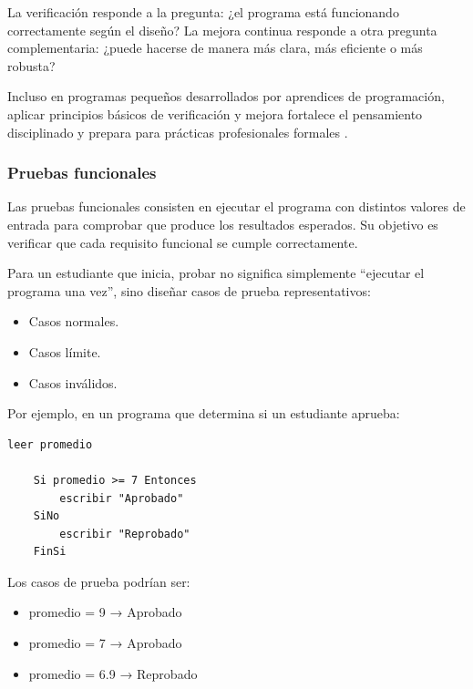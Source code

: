 \documentclass[12pt,twoside]{book}
\begin{document}
					La verificación responde a la pregunta: ¿el programa está funcionando correctamente según el diseño? La mejora continua responde a otra pregunta complementaria: ¿puede hacerse de manera más clara, más eficiente o más robusta?
					
					Incluso en programas pequeños desarrollados por aprendices de programación, aplicar principios básicos de verificación y mejora fortalece el pensamiento disciplinado y prepara para prácticas profesionales formales \cite{SWEBOK2025Guide}.
						
					\subsubsection{Pruebas funcionales}
						\noindent
						Las pruebas funcionales consisten en ejecutar el programa con distintos valores de entrada para comprobar que produce los resultados esperados. Su objetivo es verificar que cada requisito funcional se cumple correctamente.
						
						Para un estudiante que inicia, probar no significa simplemente “ejecutar el programa una vez”, sino diseñar casos de prueba representativos:
						
						\begin{itemize}
							\item Casos normales.
							\item Casos límite.
							\item Casos inválidos.
						\end{itemize}
						
						Por ejemplo, en un programa que determina si un estudiante aprueba:
						
						\begin{lstlisting}[style=upsamStyle, caption={Algoritmo básico para determinar aprobación.}, label={lst:PruebaAprobacionBase}, basicstyle=\small\ttfamily]
	leer promedio
	
	Si promedio >= 7 Entonces
		escribir "Aprobado"
	SiNo
		escribir "Reprobado"
	FinSi \end{lstlisting}
						
						\noindent
						Los casos de prueba podrían ser:
						
						\begin{itemize}
							\item promedio = 9  → Aprobado
							\item promedio = 7  → Aprobado
							\item promedio = 6.9 → Reprobado
						\end{itemize}
						
\end{document}
